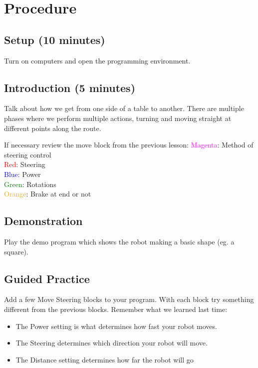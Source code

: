 \documentclass{lessonplan}
\begin{document}
      
      
  \section{Procedure}
  
    \subsection{Setup (10 minutes)}
      Turn on computers and open the programming environment.
      
    \subsection{Introduction (5 minutes)}
        Talk about how we get from one side of a table to another. There are multiple phases where we perform multiple actions, turning and moving straight at different points along the route.
        \par
        If necessary review the move block from the previous lesson:
            \textcolor{magenta}{Magenta}: Method of steering control \hfill \\
            \textcolor{red}{Red}: Steering  \hfill \\
            \textcolor{blue}{Blue}: Power  \hfill \\
            \textcolor{green}{Green}: Rotations  \hfill \\
            \textcolor{orange}{Orange}: Brake at end or not  \hfill \\
    \subsection{Demonstration}
      Play the demo program which shows the robot making a basic shape (eg. a square).
    
    \subsection{Guided Practice}
        Add a few Move Steering blocks to your program.
        With each block try something different from the previous blocks. 
        Remember what we learned last time:
        \begin{itemize}
            \item The Power setting is what determines how fast your robot moves.
            \item The Steering determines which direction your robot will move.
            \item The Distance setting determines how far the robot will go
        \end{itemize}
        
\end{document}
